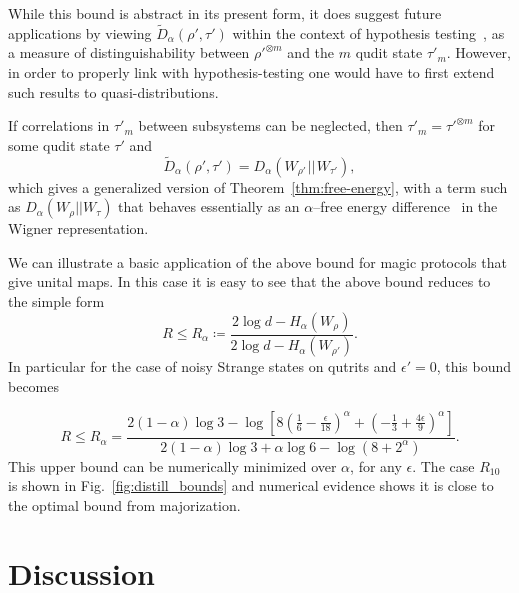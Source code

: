 \documentclass[
onecolumn,
superscriptaddress
]{revtex4-1}
\begin{document}
While this bound is abstract in its present form, it does suggest future applications by viewing $\widetilde{D}_\alpha( \rho', \tau')$ within the context of hypothesis testing~\cite{tomamichel2013}, as a measure of distinguishability between $\rho'^{\otimes m}$ and the $m$ qudit state $\tau'_m$. 
However, in order to properly link with hypothesis-testing one would have to first extend such results to quasi-distributions.

If correlations in $\tau'_m$ between subsystems can be neglected, then $\tau'_m = \tau'^{\otimes m}$ for some qudit state $\tau'$ and
\begin{equation}
	\widetilde{D}_\alpha( \rho', \tau') = D_\alpha (W_{\rho'} \hspace{1pt}||\hspace{1pt} W_{\tau'}),
\end{equation}
which gives a generalized version of Theorem~\ref{thm:free-energy}, with a term such as $D_\alpha(W_\rho ||W_\tau)$ that behaves essentially as an $\alpha$--free energy difference~\cite{Brandao_2015} in the Wigner representation.

We can illustrate a basic application of the above bound for magic protocols that give unital maps. In this case it is easy to see that the above bound reduces to the simple form
\begin{equation}\label{eq:Ra}
	R \leq R_\alpha \coloneqq \frac{2\log d - H_{\alpha}(W_\rho)}{2\log d - H_{\alpha}(W_{\rho'})}.
\end{equation}
In particular for the case of noisy Strange states on qutrits and $\epsilon'=0$, this bound becomes

\begin{equation}
	R \leq R_\alpha = \frac{2(1-\alpha)\log 3 - \log \left [8(\frac{1}{6} - \frac{\epsilon}{18})^\alpha + (-\frac{1}{3} + \frac{4\epsilon}{9})^\alpha\right ] }{2(1-\alpha)\log 3 + \alpha \log 6 - \log (8 + 2^\alpha )}.
\end{equation}
This upper bound can be numerically minimized over $\alpha$, for any $\epsilon$. The case $R_{10}$ is shown in Fig.~\ref{fig:distill_bounds} and numerical evidence shows it is close to the optimal bound from majorization.

\section*{Discussion}
\end{document}
